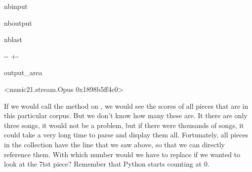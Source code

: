 \documentclass[letterpaper,10pt,english]{sphinxmanual}
\newlength\nbsphinxcodecellspacing
\begin{document}
\begin{sphinxuseclass}{nbinput}
{
\begin{sphinxVerbatim}[commandchars=\\\{\}]
\llap{\color{nbsphinxin}[14]:\,\hspace{\fboxrule}\hspace{\fboxsep}}
\end{sphinxVerbatim}
}

\end{sphinxuseclass}
\begin{sphinxuseclass}{nboutput}
\begin{sphinxuseclass}{nblast}
{

\kern-\sphinxverbatimsmallskipamount\kern-\baselineskip
\kern+\FrameHeightAdjust\kern-\fboxrule
\vspace{\nbsphinxcodecellspacing}

\begin{sphinxuseclass}{output_area}
\begin{sphinxuseclass}{}


\begin{sphinxVerbatim}[commandchars=\\\{\}]
\llap{\color{nbsphinxout}[14]:\,\hspace{\fboxrule}\hspace{\fboxsep}}<music21.stream.Opus 0x1898b5ff4c0>
\end{sphinxVerbatim}



\end{sphinxuseclass}
\end{sphinxuseclass}
}

\end{sphinxuseclass}
\end{sphinxuseclass}
\sphinxAtStartPar
If we would call the  method on , we would see the scores of all pieces that are in this particular corpus. But we don’t know how many these are. It there are only three songs, it would not be a problem, but if there were thousands of songs, it could take a very long time to parse and display them all. Fortunately, all pieces in the collection have the  line that we saw above, so that we can directly reference them. With which number would we have to replace
 if we wanted to look at the 7tst piece? Remember that Python starts counting at 0.
\end{document}
